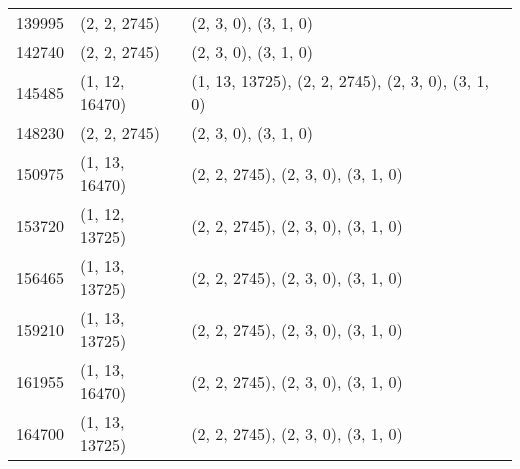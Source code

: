\begin{center}
\begin{longtable}{|l|l|l|}
139995 & (2, 2, 2745) & (2, 3, 0), (3, 1, 0) \\
142740 & (2, 2, 2745) & (2, 3, 0), (3, 1, 0) \\
145485 & (1, 12, 16470) & (1, 13, 13725), (2, 2, 2745), (2, 3, 0), (3, 1, 0) \\
148230 & (2, 2, 2745) & (2, 3, 0), (3, 1, 0) \\
150975 & (1, 13, 16470) & (2, 2, 2745), (2, 3, 0), (3, 1, 0) \\
153720 & (1, 12, 13725) & (2, 2, 2745), (2, 3, 0), (3, 1, 0) \\
156465 & (1, 13, 13725) & (2, 2, 2745), (2, 3, 0), (3, 1, 0) \\
159210 & (1, 13, 13725) & (2, 2, 2745), (2, 3, 0), (3, 1, 0) \\
161955 & (1, 13, 16470) & (2, 2, 2745), (2, 3, 0), (3, 1, 0) \\
164700 & (1, 13, 13725) & (2, 2, 2745), (2, 3, 0), (3, 1, 0) \\
\end{longtable}
\end{center}